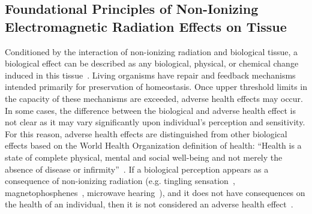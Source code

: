 \subsection{Foundational Principles of Non-Ionizing Electromagnetic Radiation Effects on Tissue}
\label{sec:principles}
Conditioned by the interaction of non-ionizing radiation and biological tissue, a biological effect can be described as any biological, physical, or chemical change induced in this tissue~\cite{ICNIRP2020Principles}.
Living organisms have repair and feedback mechanisms intended primarily for preservation of homeostasis.
Once upper threshold limits in the capacity of these mechanisms are exceeded, adverse health effects may occur.
In some cases, the difference between the biological and adverse health effect is not clear as it may vary significantly upon individual's perception and sensitivity.
For this reason, adverse health effects are distinguished from other biological effects based on the World Health Organization definition of health: ``Health is a state of complete physical, mental and social well-being and not merely the absence of disease or infirmity''~\cite{WHO2022Health}.
If a biological perception appears as a consequence of non-ionizing radiation (e.g. tingling sensation~\cite{Saunders2007neurobiological}, magnetophosphenes~\cite{Lövsund1980Magnetophosphenes}, microwave hearing~\cite{Frey1962Human}), and it does not have consequences on the health of an individual, then it is not considered an adverse health effect~\cite{ICNIRP2020Principles}.


